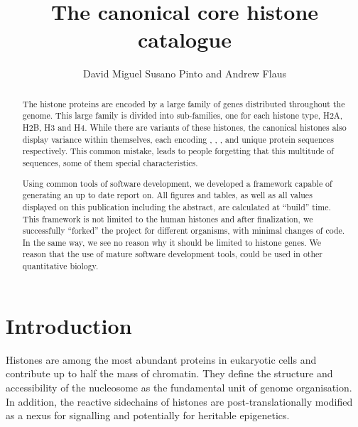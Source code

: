 \documentclass[10pt,a4paper,draft,article]{memoir}
\author{David Miguel Susano Pinto and Andrew Flaus}
\title{The canonical core histone catalogue}
\begin{document}
  \maketitle

  \begin{abstract}
    The histone proteins are encoded by a large family of genes distributed throughout the
    genome. This large family is divided into sub-families, one for each histone type, H2A,
    H2B, H3 and H4. While there are variants of these histones, the canonical histones
    also display variance within themselves, each encoding \TotalHTwoA{}, \TotalHTwoB{}, \TotalHThree{},
    and \TotalHFour{} unique protein sequences respectively. This common mistake, leads
    to people forgetting that this multitude of sequences, some of them special characteristics.
    
    Using common tools of software development, we developed a framework capable of generating
    an up to date report on. All figures and tables, as well as all values displayed on
    this publication including the abstract, are calculated at ``build'' time. This framework
    is not limited to the human histones and after finalization, we successfully ``forked'' the
    project for different organisms, with minimal changes of code. In the same way, we see no
    reason why it should be limited to histone genes. We reason that the use of mature software
    development tools, could be used in other quantitative biology.

  \end{abstract}

  \section{Introduction}

    Histones are among the most abundant proteins in eukaryotic cells and contribute up
    to half the mass of chromatin. They define the structure and accessibility of the
    nucleosome as the fundamental unit of genome organisation. In addition, the reactive
    sidechains of histones are post-translationally modified as a nexus for signalling
    and potentially for heritable epigenetics.
\end{document}
